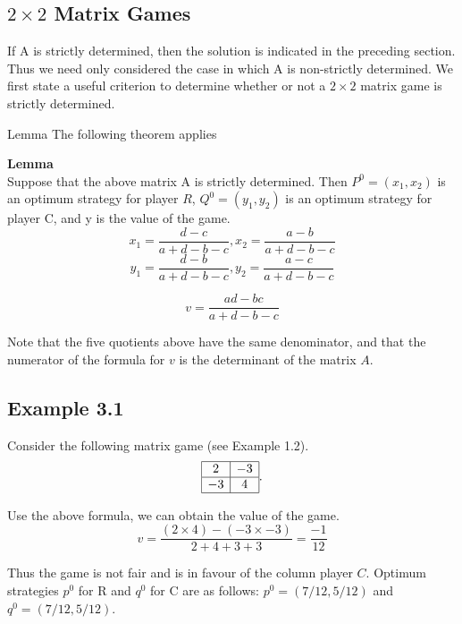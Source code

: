 \documentclass[]{report}
\begin{document}
\subsection{$2 \times 2$ Matrix Games}
If A is strictly determined, then the solution is indicated in the preceding section. Thus we
need only considered the case in which A is non-strictly determined.
We first state a useful criterion to determine whether or not a $2 \times 2$ matrix game is strictly determined.

Lemma
The following theorem applies



\noindent \textbf{Lemma}\\
Suppose that the above matrix A is strictly determined. Then $P^0 = (x_1,x_2)$ is an optimum strategy for player $R$, $Q^0 = (y_1,y_2)$ is an optimum strategy for player C, and y is the value of the game.
\[ x_1 = \frac{d-c}{a+d-b-c}, x_2 = \frac{a-b}{a+d-b-c}\]
\[ y_1 = \frac{d-b}{a+d-b-c}, y_2 = \frac{a-c}{a+d-b-c}\]

\[ v = \frac{ad-bc}{a+d-b-c} \]

Note that the five quotients above have the same denominator, and that the numerator of the formula for $v$ is the determinant of 
the matrix $A$.

\subsection*{Example 3.1}
Consider the following matrix game (see Example 1.2).
\[
\begin{array}{|c|c|} \hline
   2 & -3 \\ \hline
  -3 & 4 \\ \hline
\end{array}.
\]

Use the above formula, we can obtain the value of the game.
\[ v = \frac{(2\times4)-(-3 \times-3)}{2+4+3+3} = \frac{-1}{12} \]

Thus the game is not fair and is in favour of the column player $C$. Optimum strategies $p^0$ for R and $q^0$ for C are as follows:
$p^0 = (7/12,5/12)$ and $q^0 = (7/12,5/12)$.

\end{document}
